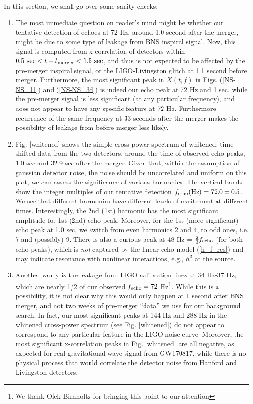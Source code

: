 \documentclass[a4paper,11pt]{article}
\begin{document}
In this section, we shall go over some sanity checks: 
\begin{enumerate}

\item The most immediate question on reader's mind might be whether our tentative detection of echoes at $72$ Hz, around 1.0 second after the merger, might be due to some type of leakage from BNS inspiral signal. Now, this signal is computed from x-correlation of detectors within $0.5 ~{\rm sec}<  t - t_{\rm merger} < 1.5 ~{\rm sec}$, and thus is not expected to be affected by the pre-merger inspiral signal, or the LIGO-Livingston glitch at 1.1 second before merger. Furthermore, the most significant peak in $X(t,f)$ in Figs. (\ref{NS-NS_11}) and (\ref{NS-NS_3d}) is indeed our echo peak at 72 Hz and 1 sec, while the pre-merger signal is less significant (at any particular frequency), and does not appear to have any specific feature at 72 Hz. Furthermore, recurrence of the same frequency at 33 seconds after the merger makes the possibility of leakage from before merger less likely.

\item Fig. \ref{whitened} shows the simple cross-power spectrum of whitened, time-shifted data from the two detectors, around the time of observed echo peaks, 1.0 sec and 32.9 sec after the merger. Given that, within the assumption of gaussian detector noise, the noise should be uncorrelated and uniform on this plot, we can assess the significance of various harmonics. The vertical bands show the integer multiples of our tentative detection $f_{\rm echo}({\rm Hz}) = 72.0 \pm 0.5$. We see that different harmonics have different levels of excitement at different times. Interestingly, the 2nd (1st) harmonic has the most significant amplitude for 1st (2nd) echo peak. Moreover, for the 1st (more significant) echo peak at 1.0 sec, we switch from even harmonics 2 and 4, to odd ones, i.e. 7 and (possibly) 9. There is also a curious peak at 48 Hz = $\frac{2}{3} f_{\rm echo}$ (for both echo peaks), which is {\it not} captured by the linear echo model (\ref{h_f_res}) and may indicate resonance with nonlinear interactions, e.g., $h^3$ at the source. 

\item Another worry is the leakage from LIGO calibration lines at 34 Hz-37 Hz, which are nearly 1/2 of our observed $f_{\rm echo} = 72$ Hz\footnote{We thank Ofek Birnholtz for bringing this point to our attention}. While this is a possibility, it is not clear why this would only happen at 1 second after BNS merger, and not two weeks of pre-merger ``data'' we use for our background search. In fact, our most significant peaks at 144 Hz and 288 Hz in the whitened cross-power spectrum  (see Fig. \ref{whitened}) do not appear to correspond to any particular feature in the LIGO noise curve. Moreover, the most significant x-correlation peaks in Fig. \ref{whitened} are all negative, as expected for real gravitational wave signal from GW170817, while there is no physical process that would correlate the detector noise from Hanford and Livingston detectors.  


\end{enumerate}
\end{document}
